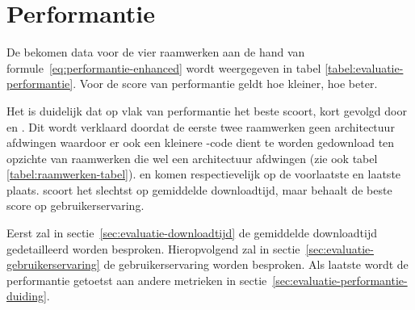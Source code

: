 \section{Performantie}
\label{sec:evaluatie-performantie}

De bekomen data voor de vier raamwerken aan de hand van formule~\ref{eq:performantie-enhanced} wordt weergegeven in tabel \ref{tabel:evaluatie-performantie}.
Voor de score van performantie geldt hoe kleiner, hoe beter.
\begin{table}
\centering
{}
\caption{Overzicht van performantie voor \st{}~(\sta), \kendo{}~(\kendoa), \jqm{}~(\jqma) en \lungo{}~(\lungoa). Minder is beter.}
\label{tabel:evaluatie-performantie}
\end{table}

Het is duidelijk dat op vlak van performantie \lungo{} het beste scoort, kort gevolgd door \jqm{} en \st{}.
Dit wordt verklaard doordat de eerste twee raamwerken geen architectuur afdwingen waardoor er ook een kleinere \js{}-code dient te worden gedownload ten opzichte van raamwerken die wel een architectuur afdwingen (zie ook tabel \ref{tabel:raamwerken-tabel}).
\kendo{} en \st{} komen respectievelijk op de voorlaatste en laatste plaats.
\st{} scoort het slechtst op gemiddelde downloadtijd, maar behaalt de beste score op gebruikerservaring.

Eerst zal in sectie~\ref{sec:evaluatie-downloadtijd} de gemiddelde downloadtijd gedetailleerd worden besproken.
Hieropvolgend zal in sectie~\ref{sec:evaluatie-gebruikerservaring} de gebruikerservaring worden besproken.
Als laatste wordt de performantie getoetst aan andere metrieken in sectie~\ref{sec:evaluatie-performantie-duiding}.


